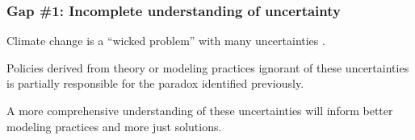 \begin{frame}
    \frametitle{Gap \#1: Incomplete understanding of uncertainty}

    Climate change is a ``wicked problem'' with many uncertainties \cite{grundmann_ozone_2018}. 
    
    Policies derived from theory or modeling practices ignorant of these uncertainties is partially
    responsible for the paradox identified previously.
    
    A more comprehensive understanding of these uncertainties will inform better modeling practices and 
    more just solutions. 

\end{frame}